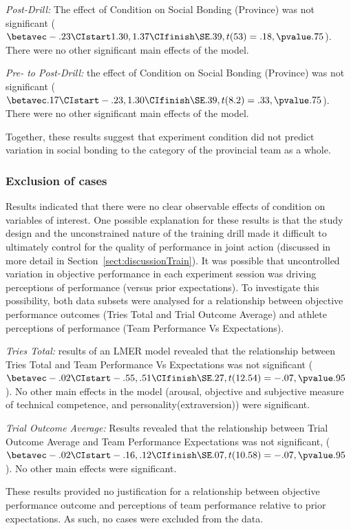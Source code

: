 \begin{CJK}{UTF8}{gbsn}
\textit{Post-Drill:}
The effect of Condition on Social Bonding (Province) was not significant ($\betavec -.23 \CIstart 1.30, 1.37 \CIfinish \SE .39, t(53)= .18, \pvalue .75$). There were no other significant main effects of the model.

\textit{Pre- to Post-Drill:} the effect of Condition on Social Bonding (Province) was not significant ($\betavec .17 \CIstart -.23, 1.30 \CIfinish \SE .39, t(8.2)= .33, \pvalue .75$). There were no other significant main effects of the model.

Together, these results suggest that experiment condition did not predict variation in social bonding to the category of the provincial team as a whole.


\subsubsection{Exclusion of cases}
Results indicated that there were no clear observable effects of condition on variables of interest.  One possible explanation for these results is that the study design and the unconstrained nature of the training drill made it difficult to ultimately control for the quality of performance in joint action (discussed in more detail in Section~\ref{sect:discussionTrain}).  It was possible that uncontrolled variation in objective performance in each experiment session was driving perceptions of performance (versus prior expectations).  To investigate this possibility, both data subsets were analysed for a relationship between objective performance outcomes (Tries Total and Trial Outcome Average) and athlete perceptions of performance (Team Performance Vs Expectations).

\textit{Tries Total:} results of an LMER model revealed that the relationship between Tries Total and Team Performance Vs Expectations was not significant ($\betavec -.02 \CIstart -.55, .51 \CIfinish \SE .27, t(12.54)= -.07, \pvalue .95$).  No other main effects in the model (arousal, objective and subjective measure of technical competence, and personality(extraversion)) were significant.

\textit{Trial Outcome Average:} Results revealed that the relationship between Trial Outcome Average and Team Performance Expectations was not significant, ($\betavec -.02 \CIstart -.16, .12 \CIfinish \SE .07, t(10.58)= -.07, \pvalue .95$). No other main effects were significant.

These results provided no justification for a relationship between objective performance outcome and perceptions of team performance relative to prior expectations.  As such, no cases were excluded from the data.


\end{CJK}
